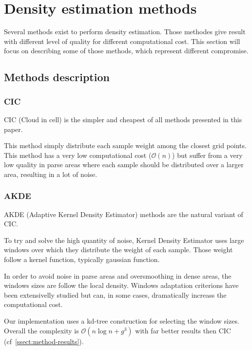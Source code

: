 \documentclass[10pt,a4paper,twoside,twocolumn]{article}
\begin{document}
\section{Density estimation methods}

Several methods exist to perform density estimation. Those methodes give result
with different level of quality for different computational cost. This section
will focus on describing some of those methods, which represent different
compromise.

\subsection{Methods description}

\subsubsection{CIC}

CIC\cite{Birdsall_Fuss_1969} (Cloud in cell) is the simpler and cheapest of all
methods presented in this paper. 

This method simply distribute each sample weight among the closest grid points.
This method has a very low computational cost ($\mathcal O(n)$) but suffer from
a very low quality in parse areas where each sample should be distributed over a
larger area, resulting in a lot of noise.

\subsubsection{AKDE}

AKDE\cite{Rosenblatt}\cite{Parzen1962} (Adaptive Kernel Density Estimator)
methods are the natural variant of CIC.

To try and solve the high quantity of noise, Kernel Density Estimator uses large
windows over which they distribute the weight of each sample. Those weight
follow a kernel function, typically gaussian function.

In order to avoid noise in parse areas and oversmoothing in dense areas, the
windows sizes are follow the local density. Windows adaptation criterions have
been extensivelly studied\cite{Heidenreich2013} but can, in some cases,
dramatically increass the computational cost.

Our implementation uses a kd-tree construction for selecting the window sizes.
Overall the complexity is $\mathcal O(n\log n + g^3)$ with far better results
then CIC (cf~\ref{ssect:method-results}).
\end{document}
